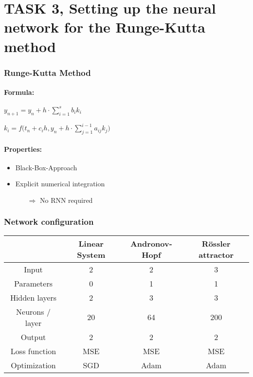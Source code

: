 \section{TASK 3, Setting up the neural network for the Runge-Kutta method}

\begin{frame}
	\frametitle{Runge-Kutta Method}
	\paragraph{Formula:}
	\quad\quad $y_{n+1} = y_n + h \cdot \sum_{i=1}^s b_i k_i$
	
	\quad\quad $k_i = f \Bigg( t_n + c_i h, y_n + h \cdot \sum_{j=1}^{i-1} a_{ij} k_j\Bigg)$
	\vspace{5mm}
	
	\paragraph{Properties:}\vspace{-2mm}
	\begin{itemize}
		\item Black-Box-Approach
		\item Explicit numerical integration
		\begin{itemize}
			\item[$\Rightarrow$] No RNN required
		\end{itemize}
	\end{itemize}
\end{frame}

\begin{frame}
	\frametitle{Network configuration}
	\centering
	\begin{tabular} { c | c | c | c}
		& Linear System & Andronov-Hopf & R\"ossler attractor	\\
		\hline
		Input			& 2 		& 2			& 3			\\
		\hline
		Parameters		& 0			& 1			& 1			\\
		\hline
		Hidden layers	& 2			& 3			& 3			\\
		\hline
		Neurons / layer	& 20		& 64		& 200		\\
		\hline
		Output			& 2			& 2			& 2			\\
		\hline
		Loss function	& MSE		& MSE		& MSE		\\
		\hline
		Optimization	& SGD		& Adam		& Adam		\\
	\end{tabular}
\end{frame}
